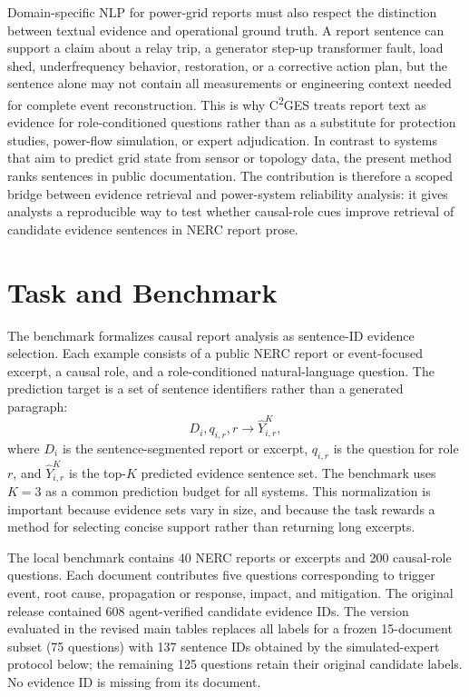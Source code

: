 \documentclass{article}
\begin{document}
Domain-specific NLP for power-grid reports must also respect the distinction between textual evidence and operational ground truth. A report sentence can support a claim about a relay trip, a generator step-up transformer fault, load shed, underfrequency behavior, restoration, or a corrective action plan, but the sentence alone may not contain all measurements or engineering context needed for complete event reconstruction. This is why C\textsuperscript{2}GES treats report text as evidence for role-conditioned questions rather than as a substitute for protection studies, power-flow simulation, or expert adjudication. In contrast to systems that aim to predict grid state from sensor or topology data, the present method ranks sentences in public documentation. The contribution is therefore a scoped bridge between evidence retrieval and power-system reliability analysis: it gives analysts a reproducible way to test whether causal-role cues improve retrieval of candidate evidence sentences in NERC report prose.

\section{Task and Benchmark}
\label{sec:task_and_benchmark}

The benchmark formalizes causal report analysis as sentence-ID evidence selection. Each example consists of a public NERC report or event-focused excerpt, a causal role, and a role-conditioned natural-language question. The prediction target is a set of sentence identifiers rather than a generated paragraph:
\begin{equation}
D_i, q_{i,r}, r \rightarrow \hat{Y}_{i,r}^{K},
\end{equation}
where $D_i$ is the sentence-segmented report or excerpt, $q_{i,r}$ is the question for role $r$, and $\hat{Y}_{i,r}^{K}$ is the top-$K$ predicted evidence sentence set. The benchmark uses $K=3$ as a common prediction budget for all systems. This normalization is important because evidence sets vary in size, and because the task rewards a method for selecting concise support rather than returning long excerpts.

The local benchmark contains 40 NERC reports or excerpts and 200 causal-role questions. Each document contributes five questions corresponding to trigger event, root cause, propagation or response, impact, and mitigation. The original release contained 608 agent-verified candidate evidence IDs. The version evaluated in the revised main tables replaces all labels for a frozen 15-document subset (75 questions) with 137 sentence IDs obtained by the simulated-expert protocol below; the remaining 125 questions retain their original candidate labels. No evidence ID is missing from its document.
\end{document}
